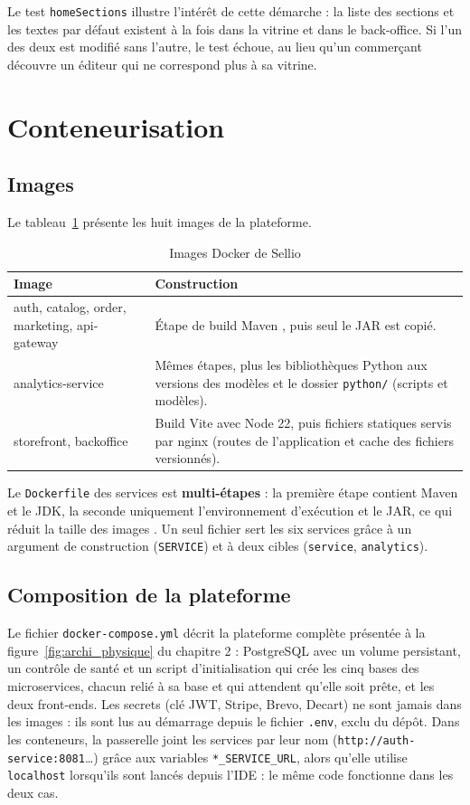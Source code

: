 Le test \texttt{homeSections} illustre l'intérêt de cette démarche : la liste des sections et les textes par défaut existent à la fois dans la vitrine et dans le back-office. Si l'un des deux est modifié sans l'autre, le test échoue, au lieu qu'un commerçant découvre un éditeur qui ne correspond plus à sa vitrine.

\section{Conteneurisation}
\subsection{Images}
Le tableau~\ref{tab:images} présente les huit images de la plateforme.
\begin{table}[H]
\centering
\renewcommand{\arraystretch}{1.3}
\small
\begin{tabular}{|p{5.8cm}|p{8.8cm}|}
\hline
\textbf{Image}  & \textbf{Construction} \\
\hline
auth, catalog, order, marketing, api-gateway & Étape de build Maven , puis seul le JAR est copié. \\
\hline
analytics-service & Mêmes étapes, plus les bibliothèques Python aux versions des modèles et le dossier \texttt{python/} (scripts et modèles). \\
\hline
storefront, backoffice & Build Vite avec Node 22, puis fichiers statiques servis par nginx (routes de l'application et cache des fichiers versionnés). \\
\hline
\end{tabular}
\caption{Images Docker de Sellio}
\label{tab:images}
\end{table}

Le \texttt{Dockerfile} des services est \textbf{multi-étapes} : la première étape contient Maven et le JDK, la seconde uniquement l'environnement d'exécution et le JAR, ce qui réduit la taille des images . Un seul fichier sert les six services grâce à un argument de construction (\texttt{SERVICE}) et à deux cibles (\texttt{service}, \texttt{analytics}).

\subsection{Composition de la plateforme}
Le fichier \texttt{docker-compose.yml} décrit la plateforme complète présentée à la figure~\ref{fig:archi_physique} du chapitre 2 : PostgreSQL avec un volume persistant, un contrôle de santé et un script d'initialisation qui crée les cinq bases des microservices, chacun relié à sa base et qui attendent qu'elle soit prête, et les deux front-ends. Les secrets (clé JWT, Stripe, Brevo, Decart) ne sont jamais dans les images : ils sont lus au démarrage depuis le fichier \texttt{.env}, exclu du dépôt. Dans les conteneurs, la passerelle joint les services par leur nom (\texttt{http://auth-service:8081}\dots) grâce aux variables \texttt{*\_SERVICE\_URL}, alors qu'elle utilise \texttt{localhost} lorsqu'ils sont lancés depuis l'IDE : le même code fonctionne dans les deux cas.

